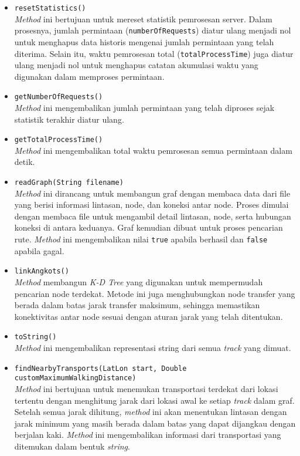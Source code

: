 \begin{itemize}
\begin{itemize}
        \item \texttt{resetStatistics()}
        \\ \textit{Method} ini bertujuan untuk mereset statistik pemrosesan server. Dalam prosesnya, jumlah permintaan (\texttt{numberOfRequests}) diatur ulang menjadi nol untuk menghapus data historis mengenai jumlah permintaan yang telah diterima. Selain itu, waktu pemrosesan total (\texttt{totalProcessTime}) juga diatur ulang menjadi nol untuk menghapus catatan akumulasi waktu yang digunakan dalam memproses permintaan. 
        \item \texttt{getNumberOfRequests()}
        \\ \textit{Method} ini mengembalikan jumlah permintaan yang telah diproses sejak statistik terakhir diatur ulang.
        \item \texttt{getTotalProcessTime()}
        \\ \textit{Method} ini mengembalikan total waktu pemrosesan semua permintaan dalam detik.
        \item \texttt{readGraph(String filename)}
        \\ \textit{Method} ini dirancang untuk membangun graf dengan membaca data dari file yang berisi informasi lintasan, node, dan koneksi antar node. Proses dimulai dengan membaca file untuk mengambil detail lintasan, node, serta hubungan koneksi di antara keduanya. Graf kemudian dibuat untuk proses pencarian rute. \textit{Method} ini mengembalikan nilai \texttt{true} apabila berhasil dan \texttt{false} apabila gagal.

        \item \texttt{linkAngkots()}
        \\ \textit{Method} membangun \textit{K-D Tree} yang digunakan untuk mempermudah pencarian node terdekat. Metode ini juga menghubungkan node transfer yang berada dalam batas jarak transfer maksimum, sehingga memastikan konektivitas antar node sesuai dengan aturan jarak yang telah ditentukan.
        \item \texttt{toString()}
        \\ \textit{Method} ini mengembalikan representasi string dari semua \textit{track} yang dimuat.
        \item \texttt{findNearbyTransports(LatLon start, Double customMaximumWalkingDistance)}
        \\ \textit{Method} ini bertujuan untuk menemukan transportasi terdekat dari lokasi tertentu dengan menghitung jarak dari lokasi awal ke setiap \textit{track} dalam graf. Setelah semua jarak dihitung, \textit{method} ini akan menentukan lintasan dengan jarak minimum yang masih berada dalam batas yang dapat dijangkau dengan berjalan kaki. \textit{Method} ini mengembalikan informasi dari transportasi yang ditemukan dalam bentuk \textit{string}.
    \end{itemize}
\end{itemize}
\newpage
